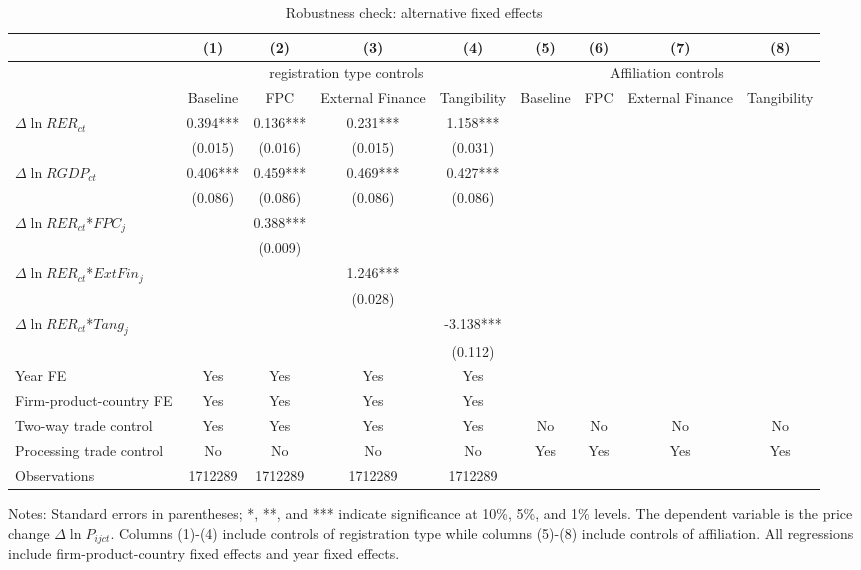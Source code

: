 \documentclass[12pt]{article}
\begin{document}
\begin{table}
	\centering
	\caption{Robustness check: alternative fixed effects}
	\begin{threeparttable}
		\begin{tabular}{lcccccccc}
			\toprule
			& (1)   & (2)   & (3)   & (4) &  (5)  &  (6)  & (7)  & (8)\\
			\midrule
			& \multicolumn{4}{c}{registration type controls} & \multicolumn{4}{c}{Affiliation controls}\\
			& Baseline & FPC   & External Finance & Tangibility & Baseline & FPC & External Finance & Tangibility\\
			\midrule
			$\Delta \ln RER_{ct}$ & 0.394*** & 0.136*** & 0.231*** & 1.158*** &&&&\\
			& (0.015) & (0.016) & (0.015) & (0.031) &&&&\\
			$\Delta \ln RGDP_{ct}$ & 0.406*** & 0.459*** & 0.469*** & 0.427*** &&&&\\
			& (0.086) & (0.086) & (0.086) & (0.086) &&&&\\
			$\Delta \ln RER_{ct}$*$FPC_{j}$ &       & 0.388*** &       &  &&&&\\
			&       & (0.009) &       &  &&&&\\
			$\Delta \ln RER_{ct}$*$ExtFin_{j}$ &       &       & 1.246*** &  &&&&\\
			&       &       & (0.028) &  &&&&\\
			$\Delta \ln RER_{ct}$*$Tang_{j}$ &       &       &       & -3.138*** &&&&\\
			&       &       &       & (0.112) &&&&\\
			Year FE  &  Yes   & Yes   & Yes   & Yes &&&&\\
			Firm-product-country FE &  Yes   & Yes   & Yes   & Yes &&&&\\
			Two-way trade control &  Yes   & Yes   & Yes   & Yes & No & No & No & No\\
			Processing trade control & No & No & No &  No &  Yes   & Yes   & Yes  & Yes \\
			Observations & 1712289 & 1712289 & 1712289 & 1712289 &&&&\\
			\bottomrule
		\end{tabular}
		\begin{tablenotes}
			\footnotesize
			\item[Notes:] Standard errors in parentheses; *, **, and *** indicate significance at 10\%, 5\%, and 1\% levels. The dependent variable is the price change $\Delta \ln P_{ijct}$. Columns (1)-(4) include controls of registration type while columns (5)-(8) include controls of affiliation. All regressions include firm-product-country fixed effects and year fixed effects.
		\end{tablenotes}
	\end{threeparttable}
	\label{tab.robust.fe}
\end{table}
\end{document}
